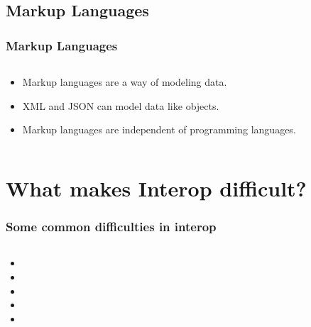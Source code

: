 \documentclass{beamer}
\begin{document}
\subsection{Markup Languages}

\begin{frame}[fragile]
  \frametitle{Markup Languages}
  
  \begin{columns}
  \begin{column}{0.5\textwidth}
  \begin{itemize}
	\item Markup languages are a way of modeling data.
	\item XML and JSON can model data like objects.
	\item Markup languages are independent of programming languages.
  \end{itemize}
  \end{column}

  \begin{column}{0.5\textwidth}
  \end{column}
  \end{columns}
  
\end{frame}


\section[Difficulty]{What makes Interop difficult?}

\begin{frame}
  \frametitle{Some common difficulties in interop}
  
  \begin{columns}
  \begin{column}{0.6\textwidth}
  \begin{itemize}
  	\item 
	\item 
	\item 
	\item 
	\item 
  \end{itemize}
  \end{column}
  \end{columns}
\end{frame}
\end{document}

